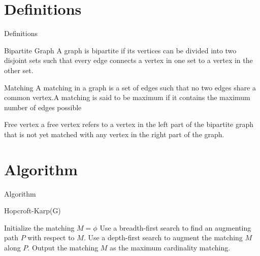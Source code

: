 \documentclass{beamer}
\begin{document}
\section{Definitions}
\begin{frame}{Definitions}
     \begin{block}{Bipartite Graph}
A graph is bipartite if its vertices can be divided into two disjoint sets such that every edge connects a vertex in one set to a vertex in the other set.
\end{block}
 \pause
\begin{block}{Matching}
A matching in a graph is a set of edges such that no two edges share a common vertex.A matching is said to be maximum if it contains the maximum number of edges possible
\end{block} \pause
\begin{block}{Free vertex}
 a free vertex refers to a vertex in the left part of the bipartite graph that is not yet matched with any vertex in the right part of the graph. 
\end{block}


\end{frame}

\section{Algorithm}
\begin{frame}{Algorithm}
\renewcommand{\thealgorithm}{}
\begin{algorithm}[H]
\caption{Hopcroft-Karp(G)}
\begin{algorithmic}[1]
\State Initialize the matching $M=\phi$ \pause
{} \pause
\State Use a breadth-first search to find an augmenting path $P$ with respect to $M$.\pause
\State Use a depth-first search to augment the matching $M$ along $P$.\pause
\EndWhile
\State Output the matching $M$ as the maximum cardinality matching.
\end{algorithmic}
\end{algorithm}
\end{frame}
\end{document}
